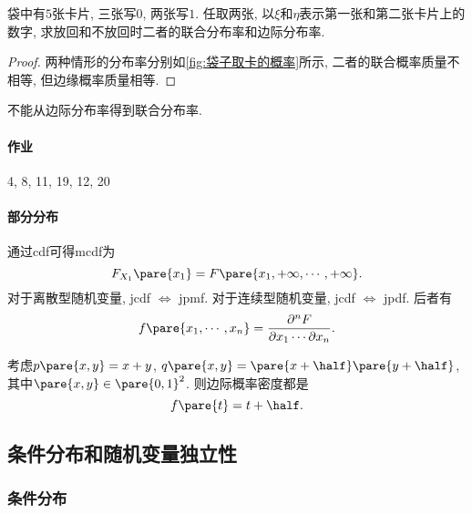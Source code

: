 \documentclass[../Statistics.tex]{subfiles}
\begin{document}
\begin{sample}
    \begin{ex}
        \label{ex:袋子取卡}
        袋中有$5$张卡片, 三张写$0$, 两张写$1$. 任取两张, 以$\xi$和$\eta$表示第一张和第二张卡片上的数字, 求放回和不放回时二者的联合分布率和边际分布率.
    \end{ex}
    \begin{proof}
        两种情形的分布率分别如\cref{fig:袋子取卡的概率}所示, 二者的联合概率质量不相等, 但边缘概率质量相等.
    \end{proof}
\end{sample}
\begin{remark}
    不能从边际分布率得到联合分布率.
\end{remark}

\paragraph{作业} %
\label{par:作业}

4, 8, 11, 19, 12, 20


\paragraph{部分分布} %
\label{par:部分分布}

通过cdf可得mcdf为
\[ F_{X_1}\pare{x_1} = F\pare{x_1,+\infty,\cdots,+\infty}. \]
对于离散型随机变量, jcdf $\Leftrightarrow$ jpmf. 对于连续型随机变量, jcdf $\Leftrightarrow$ jpdf. 后者有
\[ f\pare{x_1,\cdots, x_n} =  \frac{\partial^n F}{\partial x_1\cdots \partial x_n}. \]
\begin{sample}
    \begin{ex}
        考虑$p\pare{x,y} = x+y$, $q\pare{x,y} = \displaystyle\pare{x+\half}\pare{y+\half}$, 其中$\pare{x,y}\in \pare{0,1}^2$. 则边际概率密度都是
        \[ f\pare{t}  = t + \half. \]
    \end{ex}
\end{sample}



\subsection{条件分布和随机变量独立性} %
\label{sub:条件分布和随机变量独立性}

\subsubsection{条件分布} %
\label{ssub:条件分布}
\end{document}
